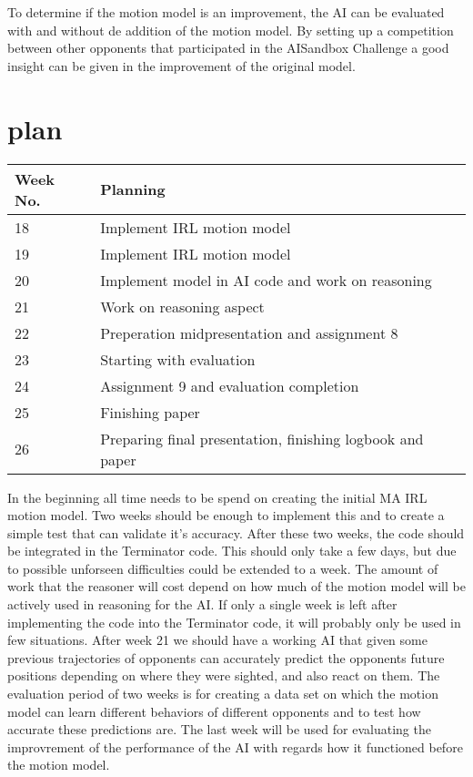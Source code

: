 \documentclass[a4paper, 12pt]{article}
\begin{document}
To determine if the motion model is an improvement, the AI can be evaluated with
and without de addition of the motion model. By setting up a competition between
other opponents that participated in the AISandbox Challenge a good insight can
be given in the improvement of the original model.
\section{plan}
\begin{table}
\centering
    \begin{tabular}{| l | l |}
      \hline                        
      Week No. & Planning \\
      \hline
      \hline
      18 &  Implement IRL motion model \\
      \hline
      19 &  Implement IRL motion model \\
      \hline
      20 &  Implement model in AI code and work on reasoning\\
      \hline
      21 &  Work on reasoning aspect \\
      \hline
      22 &  Preperation midpresentation and assignment 8\\
      \hline
      23 &  Starting with evaluation\\
      \hline
      24 &  Assignment 9 and evaluation completion \\
      \hline
      25 &  Finishing paper \\
      \hline
      26 &  Preparing final presentation, finishing logbook and paper \\
      \hline
    \end{tabular}
\end{table}
In the beginning all time needs to be spend on creating the initial MA IRL
motion model. Two weeks should be enough to implement this and to create a
simple test that can validate it's accuracy. After these two weeks, the code
should be integrated in the Terminator code. This should only take a few days,
but due to possible unforseen difficulties could be extended to a week. The
amount of work that the reasoner will cost depend on how much of the motion
model will be actively used in reasoning for the AI. If only a single week is
left after implementing the code into the Terminator code, it will probably only
be used in few situations. After week 21 we should have a working AI that given
some previous trajectories of opponents can accurately predict the opponents
future positions depending on where they were sighted, and also react on them.
The evaluation period of two weeks is for creating a data set on which the
motion model can learn different behaviors of different opponents and to test
how accurate these predictions are. The last week will be used for evaluating
the improvrement of the performance of the AI with regards how it functioned
before the motion model.




\end{document}
